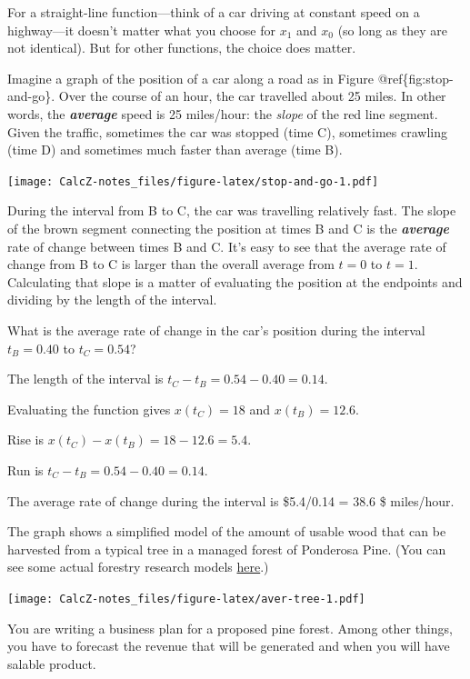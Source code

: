 \documentclass[
]{book}
\begin{document}
For a straight-line function---think of a car driving at constant speed on a highway---it doesn't matter what you choose for \(x_1\) and \(x_0\) (so long as they are not identical). But for other functions, the choice does matter.

Imagine a graph of the position of a car along a road as in Figure @ref\{fig:stop-and-go\}. Over the course of an hour, the car travelled about 25 miles. In other words, the \textbf{\emph{average}} speed is 25 miles/hour: the \emph{slope} of the red line segment. Given the traffic, sometimes the car was stopped (time C), sometimes crawling (time D) and sometimes much faster than average (time B).

\texttt{[image: CalcZ-notes\_files/figure-latex/stop-and-go-1.pdf]}

During the interval from B to C, the car was travelling relatively fast. The slope of the brown segment connecting the position at times B and C is the \textbf{\emph{average}} rate of change between times B and C. It's easy to see that the average rate of change from B to C is larger than the overall average from \(t=0\) to \(t=1\). Calculating that slope is a matter of evaluating the position at the endpoints and dividing by the length of the interval.

What is the average rate of change in the car's position during the interval \(t_B = 0.40\) to \(t_C=0.54\)?

The length of the interval is \(t_C - t_B = 0.54-0.40=0.14\).

Evaluating the function gives \(x(t_C) = 18\) and \(x(t_B) = 12.6\).

Rise is \(x(t_C) - x(t_B) = 18 - 12.6 = 5.4\).

Run is \(t_C - t_B = 0.54-0.40=0.14\).

The average rate of change during the interval is \$5.4/0.14 = 38.6 \$ miles/hour.

The graph shows a simplified model of the amount of usable wood that can be harvested from a typical tree in a managed forest of Ponderosa Pine. (You can see some actual forestry research models \href{https://www.fs.fed.us/rm/pubs/rmrs_gtr292/1992_milner.pdf}{here}.)

\texttt{[image: CalcZ-notes\_files/figure-latex/aver-tree-1.pdf]}

You are writing a business plan for a proposed pine forest. Among other things, you have to forecast the revenue that will be generated and when you will have salable product.
\end{document}
